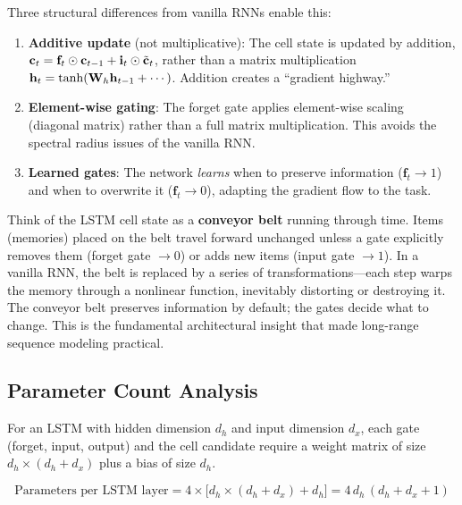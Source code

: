 Three structural differences from vanilla RNNs enable this:

\begin{enumerate}[leftmargin=*]
\item \textbf{Additive update} (not multiplicative): The cell state is
  updated by addition, $\mathbf{c}_t = \mathbf{f}_t \odot \mathbf{c}_{t-1} +
  \mathbf{i}_t \odot \tilde{\mathbf{c}}_t$, rather than a matrix multiplication
  $\mathbf{h}_t = \tanh(\mathbf{W}_h \mathbf{h}_{t-1} + \cdots)$.  Addition creates a
  ``gradient highway.''

\item \textbf{Element-wise gating}: The forget gate applies element-wise
  scaling (diagonal matrix) rather than a full matrix multiplication.  This
  avoids the spectral radius issues of the vanilla RNN.

\item \textbf{Learned gates}: The network \emph{learns} when to preserve
  information ($\mathbf{f}_t \to 1$) and when to overwrite it
  ($\mathbf{f}_t \to 0$), adapting the gradient flow to the task.
\end{enumerate}

\begin{keyinsight}
Think of the LSTM cell state as a \textbf{conveyor belt} running through
time.  Items (memories) placed on the belt travel forward unchanged unless
a gate explicitly removes them (forget gate $\to 0$) or adds new items
(input gate $\to 1$).  In a vanilla RNN, the belt is replaced by a series
of transformations---each step warps the memory through a nonlinear
function, inevitably distorting or destroying it.  The conveyor belt
preserves information by default; the gates decide what to change.
This is the fundamental architectural insight that made long-range
sequence modeling practical.
\end{keyinsight}

\subsection{Parameter Count Analysis}

For an LSTM with hidden dimension $d_h$ and input dimension $d_x$, each gate
(forget, input, output) and the cell candidate require a weight matrix of
size $d_h \times (d_h + d_x)$ plus a bias of size $d_h$.

\begin{equation}
\text{Parameters per LSTM layer}
= 4 \times \bigl[d_h \times (d_h + d_x) + d_h\bigr]
= 4\,d_h\,(d_h + d_x + 1)
\end{equation}

